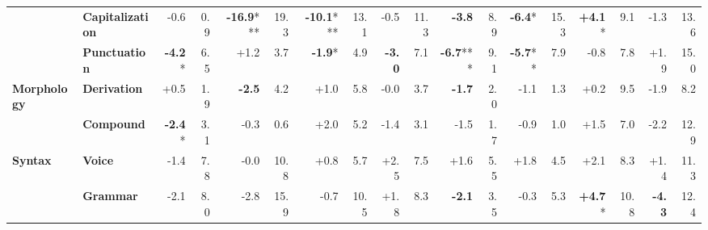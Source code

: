 \begin{table}[h]
{\begin{tabular}{llrrrrrrrrrrrrrrrr}
  & \textbf{Capitalization} & \cellcolor{red!1} -0.6 & \cellcolor{blue!0} 0.9 & \cellcolor{red!20} \textbf{-16.9}*** & \cellcolor{blue!15} 19.3 & \cellcolor{red!20} \textbf{-10.1}*** & \cellcolor{blue!10} 13.1 & \cellcolor{red!1} -0.5 & \cellcolor{blue!9} 11.3 & \cellcolor{red!7} \textbf{-3.8} & \cellcolor{blue!7} 8.9 & \cellcolor{red!12} \textbf{-6.4}* & \cellcolor{blue!12} 15.3 & \cellcolor{green!8} \textbf{+4.1}* & \cellcolor{blue!7} 9.1 & \cellcolor{red!2} -1.3 & \cellcolor{blue!10} 13.6 \\
  & \textbf{Punctuation} & \cellcolor{red!8} \textbf{-4.2}* & \cellcolor{blue!5} 6.5 & \cellcolor{green!2} +1.2 & \cellcolor{blue!2} 3.7 & \cellcolor{red!3} \textbf{-1.9}* & \cellcolor{blue!3} 4.9 & \cellcolor{red!5} \textbf{-3.0} & \cellcolor{blue!5} 7.1 & \cellcolor{red!13} \textbf{-6.7}*** & \cellcolor{blue!7} 9.1 & \cellcolor{red!11} \textbf{-5.7}** & \cellcolor{blue!6} 7.9 & \cellcolor{red!1} -0.8 & \cellcolor{blue!6} 7.8 & \cellcolor{green!3} +1.9 & \cellcolor{blue!12} 15.0 \\
\midrule
\textbf{Morphology} & \textbf{Derivation} & \cellcolor{green!0} +0.5 & \cellcolor{blue!1} 1.9 & \cellcolor{red!4} \textbf{-2.5} & \cellcolor{blue!3} 4.2 & \cellcolor{green!2} +1.0 & \cellcolor{blue!4} 5.8 & \cellcolor{red!0} -0.0 & \cellcolor{blue!2} 3.7 & \cellcolor{red!3} \textbf{-1.7} & \cellcolor{blue!1} 2.0 & \cellcolor{red!2} -1.1 & \cellcolor{blue!1} 1.3 & \cellcolor{green!0} +0.2 & \cellcolor{blue!7} 9.5 & \cellcolor{red!3} -1.9 & \cellcolor{blue!6} 8.2 \\
  & \textbf{Compound} & \cellcolor{red!4} \textbf{-2.4}* & \cellcolor{blue!2} 3.1 & \cellcolor{red!0} -0.3 & \cellcolor{blue!0} 0.6 & \cellcolor{green!4} +2.0 & \cellcolor{blue!4} 5.2 & \cellcolor{red!2} -1.4 & \cellcolor{blue!2} 3.1 & \cellcolor{red!2} -1.5 & \cellcolor{blue!1} 1.7 & \cellcolor{red!1} -0.9 & \cellcolor{blue!0} 1.0 & \cellcolor{green!2} +1.5 & \cellcolor{blue!5} 7.0 & \cellcolor{red!4} -2.2 & \cellcolor{blue!10} 12.9 \\
\midrule
\textbf{Syntax} & \textbf{Voice} & \cellcolor{red!2} -1.4 & \cellcolor{blue!6} 7.8 & \cellcolor{red!0} -0.0 & \cellcolor{blue!8} 10.8 & \cellcolor{green!1} +0.8 & \cellcolor{blue!4} 5.7 & \cellcolor{green!4} +2.5 & \cellcolor{blue!5} 7.5 & \cellcolor{green!3} +1.6 & \cellcolor{blue!4} 5.5 & \cellcolor{green!3} +1.8 & \cellcolor{blue!3} 4.5 & \cellcolor{green!4} +2.1 & \cellcolor{blue!6} 8.3 & \cellcolor{green!2} +1.4 & \cellcolor{blue!9} 11.3 \\
  & \textbf{Grammar} & \cellcolor{red!4} -2.1 & \cellcolor{blue!6} 8.0 & \cellcolor{red!5} -2.8 & \cellcolor{blue!12} 15.9 & \cellcolor{red!1} -0.7 & \cellcolor{blue!8} 10.5 & \cellcolor{green!3} +1.8 & \cellcolor{blue!6} 8.3 & \cellcolor{red!4} \textbf{-2.1} & \cellcolor{blue!2} 3.5 & \cellcolor{red!0} -0.3 & \cellcolor{blue!4} 5.3 & \cellcolor{green!9} \textbf{+4.7}* & \cellcolor{blue!8} 10.8 & \cellcolor{red!8} \textbf{-4.3} & \cellcolor{blue!9} 12.4 \\

\end{tabular}}
\end{table}

